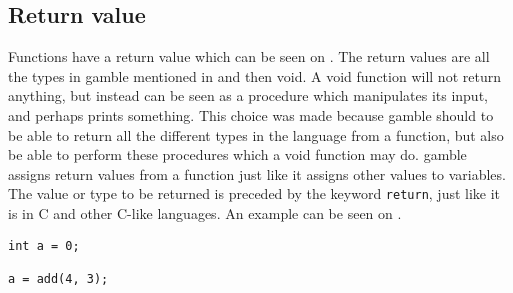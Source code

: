 \subsection*{Return value}
Functions have a return value which can be seen on .
The return values are all the types in \gls{gamble} mentioned in  and then void. 
A void function will not return anything, but instead can be seen as a procedure which manipulates its input, and perhaps prints something.
This choice was made because \gls{gamble} should to be able to return all the different types in the language from a function, but also be able to perform these procedures which a void function may do.
\gls{gamble} assigns return values from a function just like it assigns other values to variables.
The value or type to be returned is preceded by the keyword \texttt{return}, just like it is in C and other C-like languages.
An example can be seen on .

\begin{lstlisting}[caption={Return Function},label={lst:returnFunction}]
int a = 0;

a = add(4, 3);
\end{lstlisting}


%


